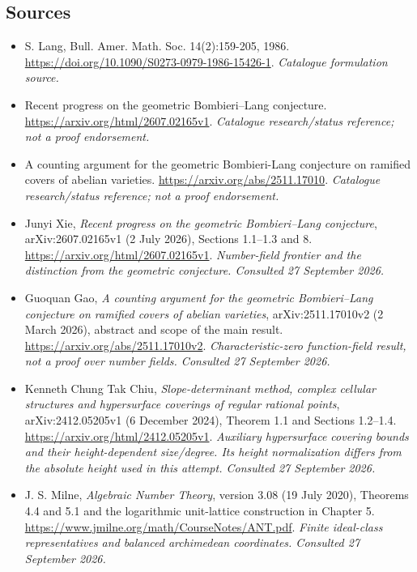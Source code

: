 \documentclass[11pt,a4paper]{article}
\numberwithin{equation}{section}
\begin{document}
\subsection{Sources}
\begin{itemize}\raggedright
\item[\textnormal{[S1]}]\hypertarget{source:statement:1}{} S. Lang, Bull. Amer. Math. Soc. 14(2):159-205, 1986.
\url{https://doi.org/10.1090/S0273-0979-1986-15426-1}.
{\small\textit{Catalogue formulation source.}}
\item[\textnormal{[S2]}]\hypertarget{source:statement:2}{} Recent progress on the geometric Bombieri–Lang conjecture.
\url{https://arxiv.org/html/2607.02165v1}.
{\small\textit{Catalogue research/status reference; not a proof endorsement.}}
\item[\textnormal{[S3]}]\hypertarget{source:statement:3}{} A counting argument for the geometric Bombieri-Lang conjecture on ramified covers of abelian varieties.
\url{https://arxiv.org/abs/2511.17010}.
{\small\textit{Catalogue research/status reference; not a proof endorsement.}}

\item[\textnormal{[E1]}]\hypertarget{extra:statement:1}{} Junyi Xie, \emph{Recent progress on the geometric Bombieri--Lang conjecture}, arXiv:2607.02165v1 (2 July 2026), Sections 1.1--1.3 and 8.
\url{https://arxiv.org/html/2607.02165v1}.
{\small\textit{Number-field frontier and the distinction from the geometric conjecture. Consulted 27 September 2026.}}
\item[\textnormal{[E2]}]\hypertarget{extra:statement:2}{} Guoquan Gao, \emph{A counting argument for the geometric Bombieri--Lang conjecture on ramified covers of abelian varieties}, arXiv:2511.17010v2 (2 March 2026), abstract and scope of the main result.
\url{https://arxiv.org/abs/2511.17010v2}.
{\small\textit{Characteristic-zero function-field result, not a proof over number fields. Consulted 27 September 2026.}}
\item[\textnormal{[E3]}]\hypertarget{extra:statement:3}{} Kenneth Chung Tak Chiu, \emph{Slope-determinant method, complex cellular structures and hypersurface coverings of regular rational points}, arXiv:2412.05205v1 (6 December 2024), Theorem 1.1 and Sections 1.2--1.4.
\url{https://arxiv.org/html/2412.05205v1}.
{\small\textit{Auxiliary hypersurface covering bounds and their height-dependent size/degree. Its height normalization differs from the absolute height used in this attempt. Consulted 27 September 2026.}}
\item[\textnormal{[E4]}]\hypertarget{extra:statement:4}{} J. S. Milne, \emph{Algebraic Number Theory}, version 3.08 (19 July 2020), Theorems 4.4 and 5.1 and the logarithmic unit-lattice construction in Chapter 5.
\url{https://www.jmilne.org/math/CourseNotes/ANT.pdf}.
{\small\textit{Finite ideal-class representatives and balanced archimedean coordinates. Consulted 27 September 2026.}}
\end{itemize}
\end{document}
